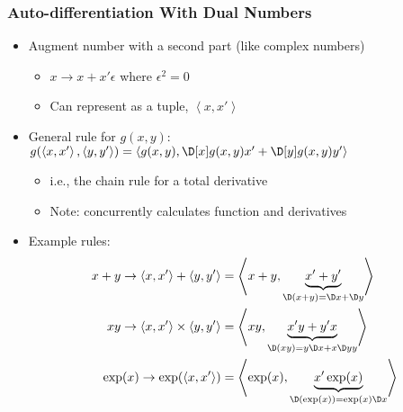\documentclass[nofootline]{etk-presentation}
\begin{document}
\begin{frame}[fragile]	\frametitle{Auto-differentiation With Dual Numbers }
	\begin{itemize}
		\item Augment number with a second part (like complex numbers)
		\begin{itemize}
			\item $x \to x + x' \epsilon$ where $\epsilon^2 = 0$
			\item Can represent as a tuple, $\left<x, x'\right>$			
		\end{itemize}
		\item General rule for $g(x,y)$: $g(\left<x,x'\right>,\left<y,y'\right>) = \left<g(x,y),\D[x]g(x,y)x' + \D[y]g(x,y)y' \right>$
		\begin{itemize}
		\item i.e., the chain rule for a total derivative
		\item Note: concurrently calculates function and derivatives
		\end{itemize}
		\item Example rules:
		\begin{align*}
		x + y \to \left<x,x'\right> + \left<y,y'\right> &= \left<x + y,\underbrace{x' + y'}_{\D(x + y) = \D x + \D y}\right>\\
		x y \to \left<x,x'\right> \times \left<y,y'\right> &= \left<x y,\underbrace{x'y + y'x}_{\D(x y) = y \D x + x \D y y}\right>\\
		\exp(x) \to \exp(\left<x, x'\right>) &= \left<\exp(x),\underbrace{x'\exp(x)}_{\D(\exp(x)) = \exp(x)\D x} \right>
		\end{align*}
	\end{itemize}
\end{frame}
\end{document}
